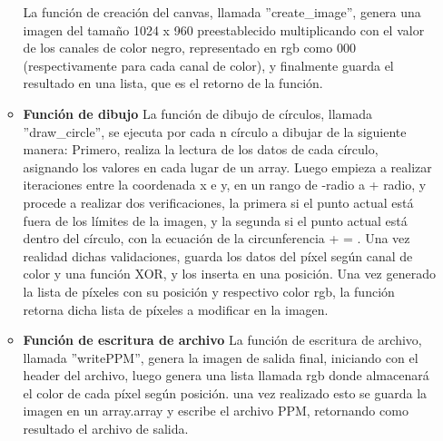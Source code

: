 \documentclass[12pt, letterpaper]{article}
\begin{document}
\begin{flushleft}
\begin{enumerate}
\begin{itemize}
            La función de creación del canvas, llamada ''create_image'', genera una imagen del tamaño 1024 x 960 preestablecido multiplicando con el valor de los canales de color negro, representado en rgb como 000 (respectivamente para cada canal de color), y finalmente guarda el resultado en una lista, que es el retorno de la función.
            \item \textbf{Función de dibujo}
            La función de dibujo de círculos, llamada ''draw_circle'', se ejecuta por cada n círculo a dibujar de la siguiente manera: Primero, realiza la lectura de los datos de cada círculo, asignando los valores en cada lugar de un array. Luego empieza a realizar iteraciones entre la coordenada x e y, en un rango de -radio a + radio, y procede a realizar dos verificaciones, la primera si el punto actual está fuera de los límites de la imagen, y la segunda si el punto actual está dentro del círculo, con la ecuación de la circunferencia  +  = . Una vez realidad dichas validaciones, guarda los datos del píxel según canal de color y una función XOR, y los inserta en una posición. Una vez generado la lista de píxeles con su posición y respectivo color rgb, la función retorna dicha lista de píxeles a modificar en la imagen.
            \item \textbf{Función de escritura de archivo}
            La función de escritura de archivo, llamada ''writePPM'', genera la imagen de salida final, iniciando con el header del archivo, luego genera una lista llamada rgb donde almacenará el color de cada píxel según posición. una vez realizado esto se guarda la imagen en un array.array y escribe el archivo PPM, retornando como resultado el archivo de salida.
        \end{itemize}


\end{enumerate}
\end{flushleft}
\end{document}

